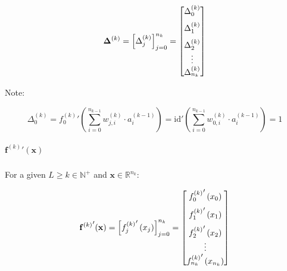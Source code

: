 \documentclass[titlepage]{article}
\begin{document}
            \begin{equation}
              \mathbf{\Delta}^{(k)}
                = \left[ \Delta_j^{(k)} \right]_{j=0}^{n_k}
                = \begin{bmatrix}
                    \vspace{1.5ex}
                    \Delta_0^{(k)} \\
                    \vspace{1.5ex}
                    \Delta_1^{(k)} \\
                    \Delta_2^{(k)} \\
                    \vdots \\
                    \Delta_{n_k}^{(k)}
                  \end{bmatrix}
            \end{equation}

            Note:

            \begin{equation}
              \Delta_0^{(k)}
                = {f_0^{(k)}}' \left(
                    \sum_{i=0}^{n_{k-1}} w_{j,i}^{(k)} \cdot a_i^{(k-1)}
                  \right)
                = {\text{id}}' \left(
                    \sum_{i=0}^{n_{k-1}} w_{0,i}^{(k)} \cdot a_i^{(k-1)}
                  \right)
                = 1
            \end{equation}

          \subparagraph{${\mathbf{f}^{(k)}}'(\mathbf{x})$}

            For a given $L \geq k \in \mathbb{N}^+$ and
            $\mathbf{x} \in \mathbb{R}^{n_k}$:

              \begin{equation}
                {\mathbf{f}^{(k)}}'(\mathbf{x})
                  = \left[ {f_j^{(k)}}' \left( x_j \right) \right]_{j=0}^{n_k}
                  = \begin{bmatrix}
                      \vspace{1.5ex}
                      {f_0^{(k)}}' \left( x_0 \right) \\
                      \vspace{1.5ex}
                      {f_1^{(k)}}' \left( x_1 \right) \\
                      {f_2^{(k)}}' \left( x_2 \right) \\
                      \vdots \\
                      {f_{n_k}^{(k)}}' \left( x_{n_k} \right)
                    \end{bmatrix}
              \end{equation}
\end{document}
